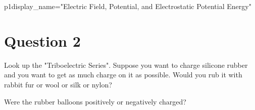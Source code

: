 \documentclass[12pt]{article}
\begin{document}
\begin{edXproblem}{p1}{display_name="Electric Field, Potential, and Electrostatic Potential Energy"}

\section{Question 2}

Look up the "Triboelectric Series". Suppose you want to charge
silicone rubber and you want to get as much charge on it as
possible. Would you rub it with rabbit fur or wool or silk or nylon?


Were the rubber balloons positively or negatively charged?



\end{edXproblem}

\end{document}
